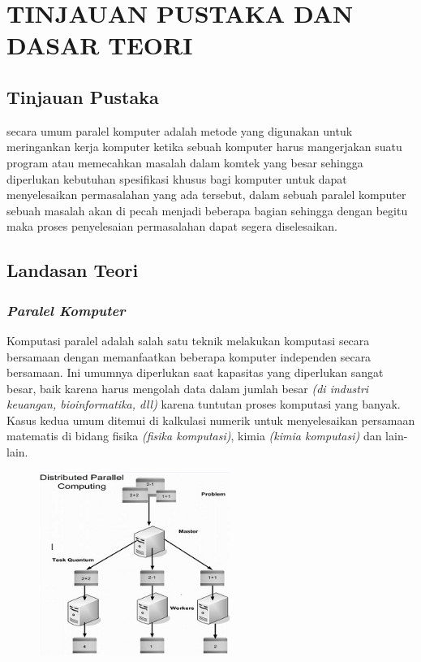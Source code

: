 \documentclass{jtetiproposalskripsi}
\begin{document}
\chapter{TINJAUAN PUSTAKA DAN DASAR TEORI}                

\section{Tinjauan Pustaka}
secara umum paralel komputer adalah metode yang digunakan untuk meringankan kerja komputer ketika sebuah komputer harus mangerjakan suatu program atau memecahkan masalah dalam komtek yang besar sehingga diperlukan kebutuhan spesifikasi khusus bagi komputer untuk dapat menyelesaikan permasalahan yang ada tersebut, dalam sebuah paralel komputer sebuah masalah akan di pecah menjadi beberapa bagian sehingga dengan begitu maka proses penyelesaian permasalahan dapat segera diselesaikan.

\section{Landasan Teori}
\subsection{\emph{Paralel Komputer}}
Komputasi paralel adalah salah satu teknik melakukan komputasi secara bersamaan dengan memanfaatkan beberapa komputer independen secara bersamaan. Ini umumnya diperlukan saat kapasitas yang diperlukan sangat besar, baik karena harus mengolah data dalam jumlah besar \emph{(di industri keuangan, bioinformatika, dll) }  karena tuntutan proses komputasi yang banyak. Kasus kedua umum ditemui di kalkulasi numerik untuk menyelesaikan persamaan matematis di bidang fisika \emph{(fisika komputasi)}, kimia \emph{(kimia komputasi)} dan lain-lain.

\begin{figure}
\centering
  \includegraphics[height=6cm]{gambar/paralel}
\end{figure}
\end{document}
